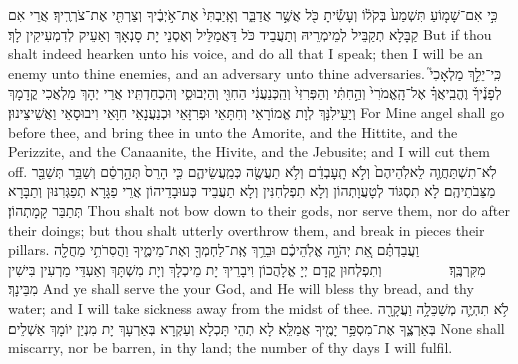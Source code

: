 {כִּ֣י אִם־שָׁמ֤וֹעַ תִּשְׁמַע֙ בְּקֹל֔וֹ וְעָשִׂ֕יתָ כֹּ֖ל אֲשֶׁ֣ר אֲדַבֵּ֑ר וְאָֽיַבְתִּי֙ אֶת־אֹ֣יְבֶ֔יךָ וְצַרְתִּ֖י אֶת־צֹרְרֶֽיךָ׃
}
{אֲרֵי אִם קַבָּלָא תְקַבֵּיל לְמֵימְרֵיהּ וְתַעֲבֵיד כֹּל דַּאֲמַלֵּיל וְאֶסְנֵי יָת סָנְאָךְ וְאַעֵיק לְדִמְעִיקִין לָךְ׃}
{But if thou shalt indeed hearken unto his voice, and do all that I speak; then I will be an enemy unto thine enemies, and an adversary unto thine adversaries.}{}
{כִּֽי־יֵלֵ֣ךְ מַלְאָכִי֮ לְפָנֶ֒יךָ֒ וֶהֱבִֽיאֲךָ֗ אֶל־הָֽאֱמֹרִי֙ וְהַ֣חִתִּ֔י וְהַפְּרִזִּי֙ וְהַֽכְּנַעֲנִ֔י הַחִוִּ֖י וְהַיְבוּסִ֑י וְהִכְחַדְתִּֽיו׃}
{אֲרֵי יְהָךְ מַלְאֲכִי קֳדָמָךְ וְיַעֵילִנָּךְ לְוָת אֱמוֹרָאֵי וְחִתָּאֵי וּפְרִזָּאֵי וּכְנַעֲנָאֵי חִוָּאֵי וִיבוּסָאֵי וַאֲשֵׁיצֵינוּן׃}
{For Mine angel shall go before thee, and bring thee in unto the Amorite, and the Hittite, and the Perizzite, and the Canaanite, the Hivite, and the Jebusite; and I will cut them off.}{}
{לֹֽא־תִשְׁתַּחֲוֶ֤ה לֵאלֹֽהֵיהֶם֙ וְלֹ֣א תָֽעׇבְדֵ֔ם וְלֹ֥א תַעֲשֶׂ֖ה כְּמַֽעֲשֵׂיהֶ֑ם כִּ֤י הָרֵס֙ תְּהָ֣רְסֵ֔ם וְשַׁבֵּ֥ר תְּשַׁבֵּ֖ר מַצֵּבֹתֵיהֶֽם׃
}
{לָא תִסְגּוֹד לְטָעֲוָתְהוֹן וְלָא תִפְלְחִנִּין וְלָא תַעֲבֵיד כְּעוּבָדֵיהוֹן אֲרֵי פַגָּרָא תְפַגְּרִנּוּן וְתַבָּרָא תְּתַבַּר קָמָתְהוֹן׃}
{Thou shalt not bow down to their gods, nor serve them, nor do after their doings; but thou shalt utterly overthrow them, and break in pieces their pillars.}{}
{וַעֲבַדְתֶּ֗ם אֵ֚ת יְהֹוָ֣ה אֱלֹֽהֵיכֶ֔ם וּבֵרַ֥ךְ אֶֽת־לַחְמְךָ֖ וְאֶת־מֵימֶ֑יךָ וַהֲסִרֹתִ֥י מַחֲלָ֖ה מִקִּרְבֶּֽךָ׃ \setuma         }
{וְתִפְלְחוּן קֳדָם יְיָ אֱלָהֲכוֹן וִיבָרֵיךְ יָת מֵיכְלָךְ וְיָת מִשְׁתָּךְ וְאַעְדֵּי מַרְעִין בִּישִׁין מִבֵּינָךְ׃}
{And ye shall serve the \lord\space your God, and He will bless thy bread, and thy water; and I will take sickness away from the midst of thee.}{}
{לֹ֥א תִהְיֶ֛ה מְשַׁכֵּלָ֥ה וַעֲקָרָ֖ה בְּאַרְצֶ֑ךָ אֶת־מִסְפַּ֥ר יָמֶ֖יךָ אֲמַלֵּֽא׃
}
{לָא תְהֵי תָּכְלָא וְעַקְרָא בְּאַרְעָךְ יָת מִנְיַן יוֹמָךְ אַשְׁלֵים׃}
{None shall miscarry, nor be barren, in thy land; the number of thy days I will fulfil.}{}
